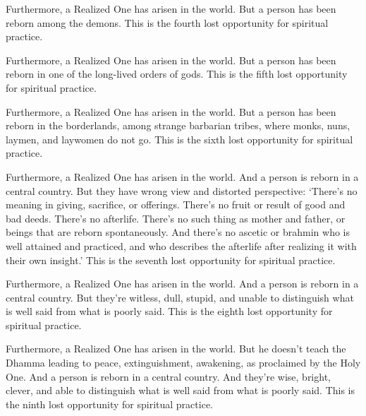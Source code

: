 \documentclass[12pt,openany]{book}%
\begin{document}
Furthermore, a Realized One has arisen in the world. But a person has been reborn among the demons. This is the fourth lost opportunity for spiritual practice. 

Furthermore, a Realized One has arisen in the world. But a person has been reborn in one of the long-lived orders of gods. This is the fifth lost opportunity for spiritual practice. 

Furthermore, a Realized One has arisen in the world. But a person has been reborn in the borderlands, among strange barbarian tribes, where monks, nuns, laymen, and laywomen do not go. This is the sixth lost opportunity for spiritual practice. 

Furthermore, a Realized One has arisen in the world. And a person is reborn in a central country. But they have wrong view and distorted perspective: ‘There’s no meaning in giving, sacrifice, or offerings. There’s no fruit or result of good and bad deeds. There’s no afterlife. There’s no such thing as mother and father, or beings that are reborn spontaneously. And there’s no ascetic or brahmin who is well attained and practiced, and who describes the afterlife after realizing it with their own insight.’ This is the seventh lost opportunity for spiritual practice. 

Furthermore, a Realized One has arisen in the world. And a person is reborn in a central country. But they’re witless, dull, stupid, and unable to distinguish what is well said from what is poorly said. This is the eighth lost opportunity for spiritual practice. 

Furthermore, a Realized One has arisen in the world. But he doesn’t teach the Dhamma leading to peace, extinguishment, awakening, as proclaimed by the Holy One. And a person is reborn in a central country. And they’re wise, bright, clever, and able to distinguish what is well said from what is poorly said. This is the ninth lost opportunity for spiritual practice. 
\end{document}
